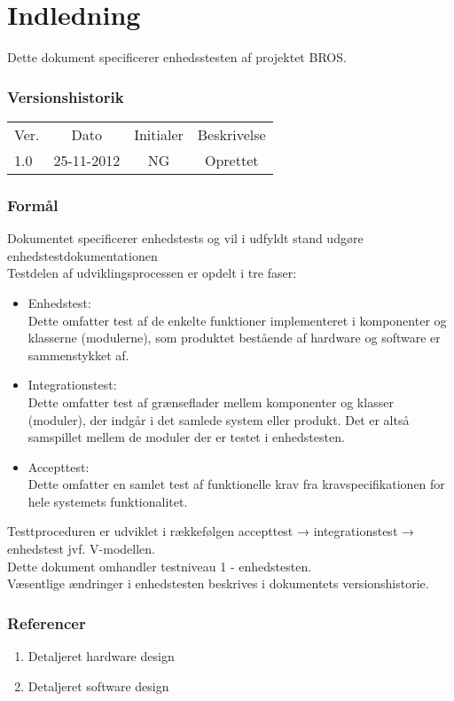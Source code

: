 \chapter{Indledning}
Dette dokument specificerer enhedsstesten af projektet BROS.
\subsection*{Versionshistorik}
\begin{table}[htbp]
\centering
\begin{tabular}{l  | c | c | c}
Ver. &Dato &Initialer &Beskrivelse\\
1.0 &25-11-2012 &NG &Oprettet\\
\end{tabular}
\end{table}
\subsection{Formål}
Dokumentet specificerer enhedstests og vil i udfyldt stand udgøre enhedstestdokumentationen\\
Testdelen af udviklingsprocessen er opdelt i tre faser:\\
\begin{itemize}
\item Enhedstest:\\
Dette omfatter test af de enkelte funktioner implementeret i komponenter og klasserne (modulerne), som produktet bestående af hardware og software er sammenstykket af.
\item Integrationstest:\\
Dette omfatter test af grænseflader mellem komponenter og klasser (moduler), der indgår i det samlede system eller produkt. Det er altså samspillet mellem de moduler der er testet i enhedstesten.
\item Accepttest:\\
Dette omfatter en samlet test af funktionelle krav fra kravspecifikationen for hele systemets funktionalitet.
\end{itemize}
Testtproceduren er udviklet i rækkefølgen accepttest → integrationstest → enhedstest jvf. V-modellen.\\
Dette dokument omhandler testniveau 1 - enhedstesten.\\
Væsentlige ændringer i enhedstesten beskrives i dokumentets versionshistorie.\\
\subsection{Referencer}
\begin{enumerate}
\item Detaljeret hardware design
\item Detaljeret software design
\end{enumerate}
